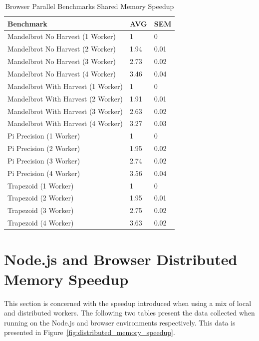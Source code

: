 \documentclass[oneside]{um-fict}
\begin{document}
\begin{table}[H]
    \begin{center}
        \begin{tabular}{|l|ll|}
            \hline
            Benchmark                  & AVG & SEM \\ \hline
            Mandelbrot No Harvest (1 Worker)   & 1       & 0              \\
            Mandelbrot No Harvest (2 Worker)   & 1.94    & 0.01           \\
            Mandelbrot No Harvest (3 Worker)   & 2.73    & 0.02           \\
            Mandelbrot No Harvest (4 Worker)   & 3.46    & 0.04           \\
            Mandelbrot With Harvest (1 Worker) & 1       & 0              \\
            Mandelbrot With Harvest (2 Worker) & 1.91    & 0.01           \\
            Mandelbrot With Harvest (3 Worker) & 2.63    & 0.02           \\
            Mandelbrot With Harvest (4 Worker) & 3.27    & 0.03           \\
            Pi Precision (1 Worker)            & 1       & 0              \\
            Pi Precision (2 Worker)            & 1.95    & 0.02           \\
            Pi Precision (3 Worker)            & 2.74    & 0.02           \\
            Pi Precision (4 Worker)            & 3.56    & 0.04           \\
            Trapezoid (1 Worker)               & 1       & 0              \\
            Trapezoid (2 Worker)               & 1.95    & 0.01           \\
            Trapezoid (3 Worker)               & 2.75    & 0.02           \\
            Trapezoid (4 Worker)               & 3.63    & 0.02           \\ \hline
        \end{tabular}
        \caption{Browser Parallel Benchmarks Shared Memory Speedup}\label{tab:browsersharedmemoryspeedup}
    \end{center}
\end{table}
\section{Node.js and Browser Distributed Memory Speedup}
This section is concerned with the speedup introduced when using a mix of local and distributed workers. The following two tables present the data collected when running on the Node.js and browser environments respectively. This data is presented in Figure~\ref{fig:distributed_memory_speedup}.
\end{document}
